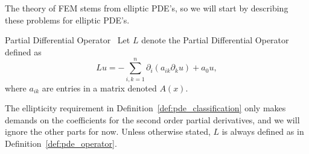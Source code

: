 The theory of FEM stems from elliptic PDE's, so we will start by
describing these problems for elliptic PDE's.
\begin{defn}{Partial Differential Operator}~\label{def:pde_operator}
    Let $L$ denote the Partial Differential Operator defined as
    \begin{equation}
        Lu = - \sum_{i,k=1}^n \partial_i(a_{ik} \partial_k u)+ a_0u,
    \end{equation}
    where $a_{ik}$ are entries in a matrix denoted $A(x)$.
\end{defn}
The ellipticity requirement in Definition~\ref{def:pde_classification} only 
makes demands on the coefficients for the second order partial derivatives, 
and we will ignore the other parts for now. Unless otherwise stated, $L$ is 
always defined as in Definition~\ref{def:pde_operator}.
